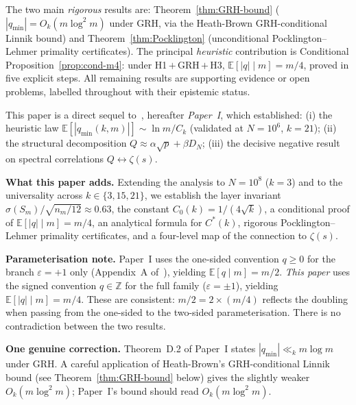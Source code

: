 \documentclass[11pt,a4paper]{article}
\theoremstyle{definition}
\theoremstyle{remark}
\newcommand{\Z}{\mathbb{Z}}
\newcommand{\E}{\mathbb{E}}
\newcommand{\qmin}{q_{\min}}
\newcommand{\eps}{\varepsilon}
\begin{document}
\begin{contribbox}
The two main \emph{rigorous} results are: Theorem~\ref{thm:GRH-bound}
($|\qmin|=O_{k}(m\log^{2}m)$ under GRH, via the Heath-Brown
GRH-conditional Linnik bound) and Theorem~\ref{thm:Pocklington}
(unconditional Pocklington--Lehmer primality certificates). The
principal \emph{heuristic} contribution is Conditional
Proposition~\ref{prop:cond-m4}: under
H1\,$+$\,GRH\,$+$\,H3, $\E[|q|\mid m]=m/4$, proved in five explicit
steps. All remaining results are supporting evidence or open
problems, labelled throughout with their epistemic status.
\end{contribbox}

\begin{relationbox}
This paper is a direct sequel to~\cite{PaperI}, hereafter
\emph{Paper~I}, which established: (i) the heuristic law
$\E[|\qmin(k,m)|]\sim\ln m/C_{k}$ (validated at $N=10^{6}$, $k=21$);
(ii) the structural decomposition $Q\approx\alpha\sqrt{p}+\beta D_{N}$;
(iii) the decisive negative result on spectral correlations
$Q\leftrightarrow\zeta(s)$.

\smallskip
\noindent\textbf{What this paper adds.} Extending the analysis to
$N=10^{8}$ ($k=3$) and to the universality across $k\in\{3,15,21\}$,
we establish the layer invariant
$\sigma(S_{m})/\sqrt{n_{m}/12}\approx 0.63$, the constant
$C_{0}(k)=1/(4\sqrt{k})$, a conditional proof of
$\E[|q|\mid m]=m/4$, an analytical formula for $C^{*}(k)$, rigorous
Pocklington--Lehmer primality certificates, and a four-level map of
the connection to $\zeta(s)$.

\smallskip
\noindent\textbf{Parameterisation note.} Paper~I uses the one-sided
convention $q\ge 0$ for the branch $\eps=+1$ only (Appendix~A
of~\cite{PaperI}), yielding $\E[q\mid m]=m/2$. \emph{This paper}
uses the signed convention $q\in\Z$ for the full family
($\eps=\pm 1$), yielding $\E[|q|\mid m]=m/4$. These are consistent:
$m/2=2\times(m/4)$ reflects the doubling when passing from the
one-sided to the two-sided parameterisation. There is no
contradiction between the two results.

\smallskip
\noindent\textbf{One genuine correction.} Theorem~D.2 of Paper~I
states $|\qmin|\ll_{k}m\log m$ under GRH. A careful application of
Heath-Brown's GRH-conditional Linnik bound \cite{HeathBrown1992}
(see Theorem~\ref{thm:GRH-bound} below) gives the slightly weaker
$O_{k}(m\log^{2}m)$; Paper~I's bound should read $O_{k}(m\log^{2}m)$.
\end{relationbox}
\end{document}
